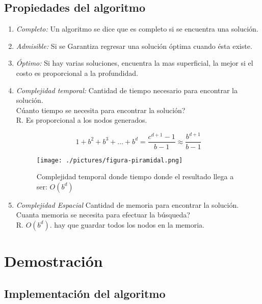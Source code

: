 \documentclass[letterpaper,12pt]{article}
\begin{document}
	\subsection{Propiedades del algoritmo}
	
	\begin{enumerate}
		\item \textit{Completo: } Un algoritmo se dice que es completo si se encuentra una soluci\'on.
		\item \textit{Admisible: } Si se Garantiza regresar una soluci\'on \'optima cuando \'esta existe.
		
		\item \textit{\'Optimo: } Si hay varias soluciones, encuentra la mas superficial, la mejor si el costo es proporcional a la profundidad.
		
		\item \textit{Complejidad temporal: } Cantidad de tiempo necesario para encontrar la soluci\'on.\\ C\'uanto tiempo se necesita para encontrar la soluci\'on?
\\ R. Es proporcional a los nodos generados.
		
		\begin{displaymath}
			1 + b^2 + b^3 + \ldots + b^d = \frac{c^{d+1}-1}{b-1} \approx \frac{b^{d+1}}{b-1}
		\end{displaymath}
		
  	\begin{figure}[!h]
  		\centering
  	  	\texttt{[image: ./pictures/figura-piramidal.png]}
	  	\caption{Complejidad temporal donde tiempo donde el resultado llega a ser: $O\left(b^d\right)$}
  		\label{fig:grafo-tres}
		\end{figure}

		\item \textit{Complejidad Espacial} Cantidad de memoria para encontrar la soluci\'on.\\
		
		Cuanta memoria se necesita para efectuar la b\'usqueda?\\
		R. $O\left(b^d\right)$. hay que guardar todos los nodos en la memoria.
	\end{enumerate}
	
	\pagebreak
	\section{Demostraci\'on}
		\subsection{Implementaci\'on del algoritmo}
		
\end{document}
